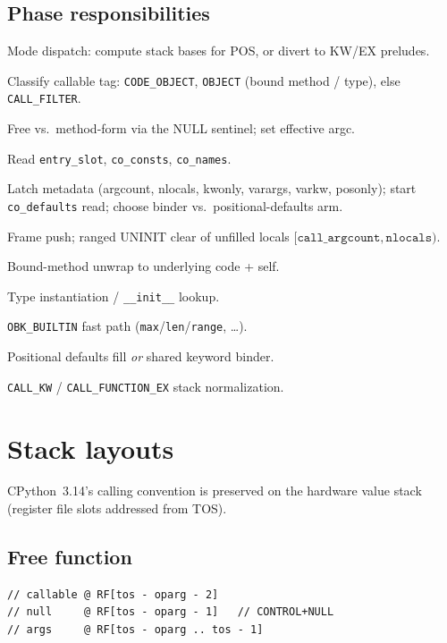 \documentclass[11pt,a4paper]{article}
\begin{document}
\subsection{Phase responsibilities}

\begin{description}[style=nextline,leftmargin=1.4cm,font=\ttfamily]
\item[0] Mode dispatch: compute stack bases for POS, or divert to KW/EX preludes.
\item[1] Classify callable tag: \texttt{CODE\_OBJECT}, \texttt{OBJECT} (bound
  method / type), else \texttt{CALL\_FILTER}.
\item[2] Free vs.\ method-form via the NULL sentinel; set effective argc.
\item[3--5] Read \texttt{entry\_slot}, \texttt{co\_consts}, \texttt{co\_names}.
\item[6] Latch metadata (argcount, nlocals, kwonly, varargs, varkw, posonly);
  start \texttt{co\_defaults} read; choose binder vs.\ positional-defaults arm.
\item[7] Frame push; ranged UNINIT clear of unfilled locals
  $[\texttt{call\_argcount}, \texttt{nlocals})$.
\item[8--11] Bound-method unwrap to underlying code + self.
\item[12] Type instantiation / \texttt{\_\_init\_\_} lookup.
\item[13] \texttt{OBK\_BUILTIN} fast path (\texttt{max}/\texttt{len}/\texttt{range}, \ldots).
\item[14] Positional defaults fill \emph{or} shared keyword binder.
\item[16--19] \texttt{CALL\_KW} / \texttt{CALL\_FUNCTION\_EX} stack normalization.
\end{description}

\section{Stack layouts}

CPython~3.14's calling convention is preserved on the hardware value stack
(register file slots addressed from TOS).

\subsection{Free function}
\begin{lstlisting}[style=sv]
// callable @ RF[tos - oparg - 2]
// null     @ RF[tos - oparg - 1]   // CONTROL+NULL
// args     @ RF[tos - oparg .. tos - 1]
\end{lstlisting}
\end{document}
